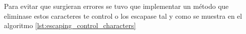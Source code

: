 Para evitar que surgieran errores se tuvo que implementar un método que eliminase estos caracteres te control o los escapase tal y como se muestra en el algoritmo \ref{lst:escaping_control_characters}


